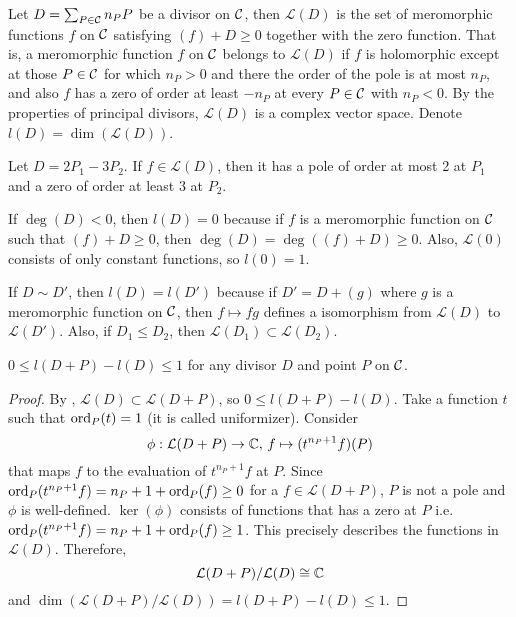 \begin{definition}[$\mathcal{L}(D)$]
    Let $D=\sum_{P\in\mathcal C}n_PP$ be a divisor on $\mathcal C$, then $\mathcal{L}(D)$ is the set of meromorphic functions $f$ on $\mathcal C$ satisfying $(f)+D\geq 0$ together with the zero function. That is, a meromorphic function $f$ on $\mathcal C$ belongs to $\mathcal{L}(D)$ if $f$ is holomorphic except at those $P\in\mathcal C$ for which $n_P>0$ and there the order of the pole is at most $n_P$, and also $f$ has a zero of order at least $-n_P$ at every $P\in\mathcal C$ with $n_P<0$. By the properties of principal divisors, $\mathcal{L}(D)$ is a complex vector space. Denote $l(D)=\dim(\mathcal{L}(D))$.
\end{definition}

\begin{example}
    Let $D=2P_1-3P_2$. If $f\in\mathcal{L}(D)$, then it has a pole of order at most 2 at $P_1$ and a zero of order at least 3 at $P_2$.
\end{example}

\begin{factx}\label{corollary:ldzero}
    If $\deg(D)<0$, then $l(D)=0$ because if $f$ is a meromorphic function on $\mathcal C$ such that $(f)+D\geq 0$, then $\deg(D)=\deg((f)+D)\geq 0$. Also, $\mathcal{L}(0)$ consists of only constant functions, so $l(0)=1$.
\end{factx}

\begin{factx}\label{fact:ld12}
    If $D\sim D'$, then $l(D)=l(D')$ because if $D'=D+(g)$ where $g$ is a meromorphic function on $\mathcal C$, then $f\mapsto fg$ defines a isomorphism from $\mathcal{L}(D)$ to $\mathcal{L}(D')$. Also, if $D_1\leq D_2$, then $\mathcal{L}(D_1)\subset\mathcal{L}(D_2)$.
\end{factx}

\begin{lemma}\label{lemma:ldp}
    $0\leq l(D+P)-l(D)\leq 1$ for any divisor $D$ and point $P$ on $\mathcal C$.
\end{lemma}

\begin{proof}
    By , $\mathcal{L}(D)\subset\mathcal{L}(D+P)$, so $0\leq l(D+P)-l(D)$. Take a function $t$ such that $\operatorname{ord}_P(t)=1$ (it is called uniformizer). Consider
    $$\phi:\mathcal{L}(D+P)\rightarrow \mathbb C,\,f\mapsto (t^{n_P+1}f)(P)$$
    that maps $f$ to the evaluation of $t^{n_P+1}f$ at $P$. Since $\operatorname{ord}_P(t^{n_P+1}f)=n_P+1+\operatorname{ord}_P(f)\geq 0$ for a $f\in\mathcal{L}(D+P)$, $P$ is not a pole and $\phi$ is well-defined. $\ker(\phi)$ consists of functions that has a zero at $P$ i.e. $\operatorname{ord}_P(t^{n_P+1}f)=n_P+1+\operatorname{ord}_P(f)\geq 1$. This precisely describes the functions in $\mathcal{L}(D)$. Therefore,
    $$\mathcal{L}(D+P)/\mathcal{L}(D)\cong\mathbb C$$
    and $\dim(\mathcal{L}(D+P)/\mathcal{L}(D))=l(D+P)-l(D)\leq 1$.
\end{proof}

